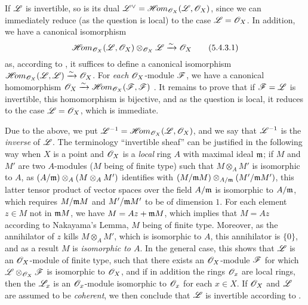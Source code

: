 \begin{env}[5.4.3]
\label{0.5.4.3}
If $\mathscr{L}$ is invertible, so is its dual
${\mathscr{L}}^\vee=\mathscr{H}\!{om}_{\mathscr{O}_X}(\mathscr{L},\mathscr{O}_X)$, since we can immediately reduce
(as the question is local) to the case $\mathscr{L}=\mathscr{O}_X$. In addition, we have a
canonical isomorphism
\[
  \mathscr{H}\!{om}_{\mathscr{O}_X}(\mathscr{L},\mathscr{O}_X)\otimes_{\mathscr{O}_X}\mathscr{L}\xrightarrow{\sim}\mathscr{O}_X
  \tag{5.4.3.1}
\]
as, according to , it suffices to define a canonical
isomorphism $\mathscr{H}\!{om}_{\mathscr{O}_X}(\mathscr{L},\mathscr{L})\xrightarrow{\sim}\mathscr{O}_X$. For {\em each}
$\mathscr{O}_X$-module $\mathscr{F}$, we have a canonical homomorphism
$\mathscr{O}_X\xrightarrow{\sim}\mathscr{H}\!{om}_{\mathscr{O}_X}(\mathscr{F},\mathscr{F})$ . It remains to
prove that if $\mathscr{F}=\mathscr{L}$ is invertible, this homomorphism is bijective, and
as the question is local, it reduces to the case $\mathscr{L}=\mathscr{O}_X$, which is
immediate.

Due to the above, we put $\mathscr{L}^{-1}=\mathscr{H}\!{om}_{\mathscr{O}_X}(\mathscr{L},\mathscr{O}_X)$, and we say
that $\mathscr{L}^{-1}$ is the {\em inverse} of $\mathscr{L}$. The terminology
``invertible sheaf'' can be justified in the following way when $X$ is a point
and $\mathscr{O}_X$ is a {\em local} ring $A$ with maximal ideal
$\mathfrak{m}$; if $M$ and $M'$ are two $A$-modules ($M$ being of finite type)
such that $M\otimes_A M'$ is isomorphic to $A$, as
$(A/\mathfrak{m})\otimes_A(M\otimes_A M')$ identifies with
$(M/\mathfrak{m}M)\otimes_{A/\mathfrak{m}}(M'/\mathfrak{m}M')$, this latter
tensor product of vector spaces over the field $A/\mathfrak{m}$ is isomorphic to
$A/\mathfrak{m}$, which requires $M/\mathfrak{m}M$ and $M'/\mathfrak{m}M'$ to be
of dimension $1$. For each element $z\in M$ not in $\mathfrak{m}M$, we have
$M=Az+\mathfrak{m}M$, which implies that $M=Az$ according to Nakayama's Lemma,
$M$ being of finite type. Moreover, as the annihilator of $z$ kills
$M\otimes_A M'$, which is isomorphic to $A$, this annihilator is $\{0\}$, and
as a result $M$ is {\em isomorphic to $A$}. In the general case, this shows
that $\mathscr{L}$ is an $\mathscr{O}_X$-module of finite type, such that there exists an
$\mathscr{O}_X$-module $\mathscr{F}$ for which $\mathscr{L}\otimes_{\mathscr{O}_X}\mathscr{F}$ is isomorphic to
$\mathscr{O}_X$, and if in addition the rings $\mathscr{O}_x$ are local rings, then the
$\mathscr{L}_x$ is an $\mathscr{O}_x$-module isomorphic to $\mathscr{O}_x$ for each $x\in X$. If
$\mathscr{O}_X$ and $\mathscr{L}$ are assumed to be {\em coherent}, we then conclude that
$\mathscr{L}$ is invertible according to .
\end{env}

